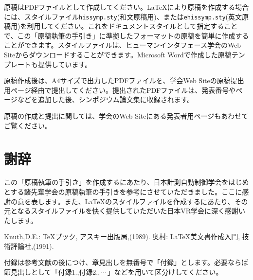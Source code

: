 \documentclass{hissymp}
\begin{document}
原稿はPDFファイルとして作成してください。\LaTeX{}\cite{tex1,tex2}により原稿を作成する場合には、スタイルファイル{\tt hissymp.sty}(和文原稿用)、または{\tt ehissymp.sty}(英文原稿用)を利用してください。これをドキュメントスタイルとして指定することで、この「原稿執筆の手引き」に準拠したフォーマットの原稿を簡単に作成することができます。スタイルファイルは、ヒューマンインタフェース学会のWeb Siteからダウンロードすることができます。Microsoft Wordで作成した原稿テンプレートも提供しています。

原稿作成後は、A4サイズで出力したPDFファイルを、学会Web Siteの原稿提出用ページ経由で提出してください。提出されたPDFファイルは、発表番号やページなどを追加した後、シンポジウム論文集に収録されます。

原稿の作成と提出に関しては、学会のWeb Siteにある発表者用ページもあわせてご覧ください。

\section*{謝辞}
この「原稿執筆の手引き」を作成するにあたり、日本計測自動制御学会をはじめとする諸先輩学会の原稿執筆の手引きを参考にさせていただきました。ここに感謝の意を表します。また、\LaTeX{}のスタイルファイルを作成するにあたり、その元となるスタイルファイルを快く提供していただいた日本VR学会に深く感謝いたします。

\begin{thebibliography}{99}
	Knuth,D.E.:
	\TeX{}ブック,
	アスキー出版局,(1989).
	奥村:
	\LaTeX{}美文書作成入門,
	技術評論社,(1991).

\end{thebibliography}


\appendix{}
付録は参考文献の後につけ、章見出しを無番号で「付録」とします。必要ならば節見出しとして「付録1.,付録2.,\,$ \cdots $\,」などを用いて区分けしてください。
\end{document}
